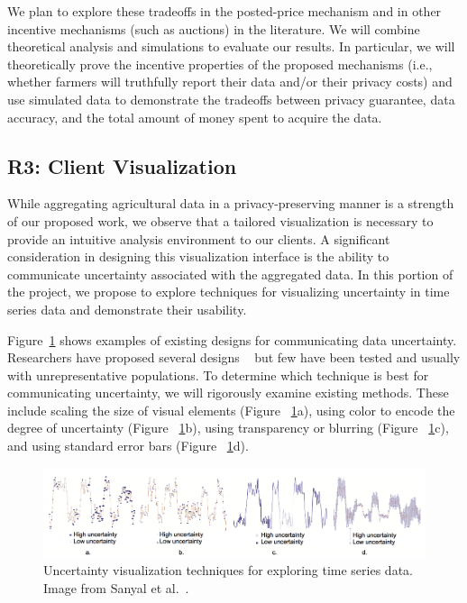 We plan to explore these tradeoffs in the posted-price mechanism and in
other incentive mechanisms (such as auctions) in the literature. 
We will combine theoretical analysis and simulations to
evaluate our results. In particular, we will theoretically prove the incentive
properties of the proposed mechanisms (i.e., whether farmers will truthfully 
report their data and/or their privacy costs) and use simulated data to 
demonstrate the tradeoffs between privacy guarantee, data accuracy, and the total
amount of money spent to acquire the data.



\subsection{R3: Client Visualization}
\label{sec:vis}


While aggregating agricultural data in a privacy-preserving manner is a strength of our proposed work, we observe that a tailored visualization is necessary to provide an intuitive analysis environment to our clients. 
A significant consideration in designing this visualization interface is the ability to communicate uncertainty associated with the aggregated data. 
In this portion of the project, we propose to explore techniques for visualizing uncertainty in time series data and demonstrate their usability.

Figure~\ref{fig:uncertainty} shows examples of existing designs for communicating data uncertainty.
Researchers have proposed several designs ~\cite{brodlie2012review,sanyal2009user,sanyal2010noodles,spiegelhalter2011visualizing} but few have been tested and usually with unrepresentative populations.  
To determine which technique is best for communicating uncertainty, we will rigorously examine existing methods. 
These include scaling the size of visual elements (Figure ~\ref{fig:uncertainty}a), using color to encode the degree of uncertainty (Figure ~\ref{fig:uncertainty}b), using transparency or blurring (Figure ~\ref{fig:uncertainty}c), and using standard error bars (Figure ~\ref{fig:uncertainty}d). 

\begin{figure}[t]
	\centering
	\includegraphics[width=1.0\columnwidth]{uncertainty}
	\caption{Uncertainty visualization techniques for exploring time series data. Image from Sanyal et al.~\cite{sanyal2009user}.}
	\label{fig:uncertainty}
\end{figure}

